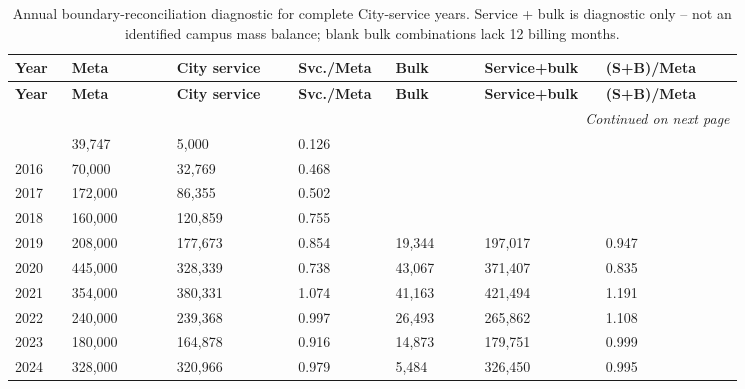 \begingroup
\footnotesize
\setlength{\tabcolsep}{3pt}
\setlength{\emergencystretch}{3em}
\raggedright
\sloppy
\begin{longtable}{@{}p{0.070\linewidth}p{0.130\linewidth}p{0.150\linewidth}p{0.120\linewidth}p{0.110\linewidth}p{0.150\linewidth}p{0.170\linewidth}@{}}
\caption{Annual boundary-reconciliation diagnostic for complete City-service years. Service + bulk is diagnostic only -- not an identified campus mass balance; blank bulk combinations lack 12 billing months.}\\
\toprule
\textbf{Year} & \textbf{Meta} & \textbf{City service} & \textbf{Svc./Meta} & \textbf{Bulk} & \textbf{Service+bulk} & \textbf{(S+B)/Meta} \\
\midrule
\endfirsthead
\toprule
\textbf{Year} & \textbf{Meta} & \textbf{City service} & \textbf{Svc./Meta} & \textbf{Bulk} & \textbf{Service+bulk} & \textbf{(S+B)/Meta} \\
\midrule
\endhead
\midrule
\multicolumn{7}{r}{\emph{Continued on next page}}\\
\endfoot
\bottomrule
\endlastfoot
2014 & 39,747 & 5,000 & 0.126 &  &  &  \\
2016 & 70,000 & 32,769 & 0.468 &  &  &  \\
2017 & 172,000 & 86,355 & 0.502 &  &  &  \\
2018 & 160,000 & 120,859 & 0.755 &  &  &  \\
2019 & 208,000 & 177,673 & 0.854 & 19,344 & 197,017 & 0.947 \\
2020 & 445,000 & 328,339 & 0.738 & 43,067 & 371,407 & 0.835 \\
2021 & 354,000 & 380,331 & 1.074 & 41,163 & 421,494 & 1.191 \\
2022 & 240,000 & 239,368 & 0.997 & 26,493 & 265,862 & 1.108 \\
2023 & 180,000 & 164,878 & 0.916 & 14,873 & 179,751 & 0.999 \\
2024 & 328,000 & 320,966 & 0.979 & 5,484 & 326,450 & 0.995 \\
\end{longtable}
\endgroup
